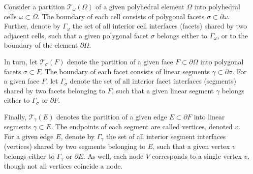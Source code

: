 	Consider a partition $\mathcal{T}_\omega (\Omega)$ of a given polyhedral element $\Omega$ into polyhedral cells $\omega \subset \Omega$. The boundary of each cell consists of polygonal facets $\sigma \subset \partial \omega$. Further, denote by $\Gamma_\omega$ the set of all interior cell interfaces (facets) shared by two adjacent cells, such that a given polygonal facet $\sigma$ belongs either to $\Gamma_\omega$, or to the boundary of the element $\partial \Omega$.
	
	In turn, let $\mathcal{T}_{\sigma} (F)$ denote the partition of a given face $F \subset \partial \Omega$ into polygonal facets $\sigma \subset F$. The boundary of each facet consists of linear segments $\gamma \subset \partial \sigma$. For a given face $F$, let $\Gamma_\sigma$ denote the set of all interior facet interfaces (segments) shared by two facets belonging to $F$, such that a given linear segment $\gamma$ belongs either to $\Gamma_\sigma$ or $\partial F$.
	
	Finally, $\mathcal{T}_{\gamma} (E)$ denotes the partition of a given edge $E \subset \partial F$ into linear segments $\gamma \subset E$. The endpoints of each segment are called vertices, denoted $v$. For a given edge $E$, denote by $\Gamma_\gamma$ the set of all interior segment interfaces (vertices) shared by two segments belonging to $E$, such that a given vertex $v$ belongs either to $\Gamma_\gamma$ or $\partial E$. As well, each node $V$ corresponds to a single vertex $v$, though not all vertices coincide a node.
	
